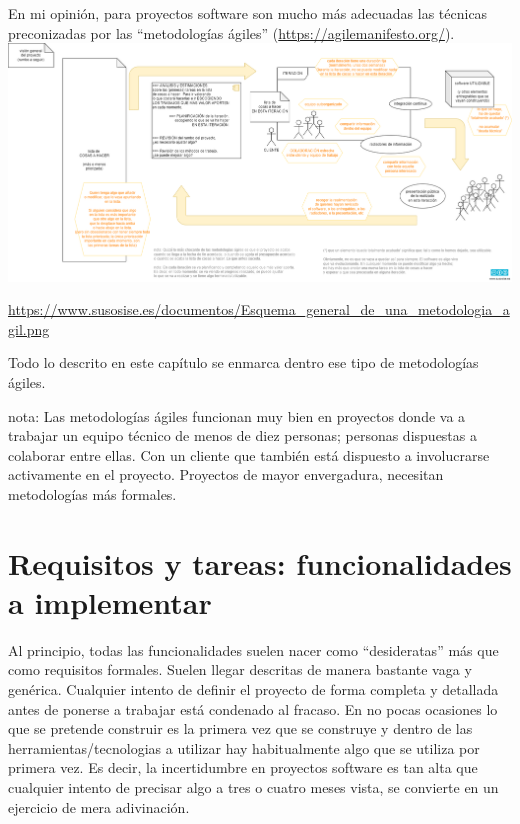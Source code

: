\documentclass[spanish,12pt,a4paper,final,oneside]{book}
\begin{document}
En mi opinión, para proyectos software son mucho más adecuadas las técnicas preconizadas por las ``metodologías ágiles'' (\url{https://agilemanifesto.org/}).
\\
\includegraphics[width=\textwidth]{Esquema_general_de_una_metodologia_agil} 
\begin{flushright}
\begin{scriptsize}
\url{https://www.susosise.es/documentos/Esquema_general_de_una_metodologia_agil.png}
\end{scriptsize}
\end{flushright}

Todo lo descrito en este capítulo se enmarca dentro ese tipo de metodologías ágiles.

nota: Las metodologías ágiles funcionan muy bien en proyectos donde va a trabajar un equipo técnico de menos de diez personas; personas dispuestas a colaborar entre ellas. Con un cliente que también está dispuesto a involucrarse activamente en el proyecto. Proyectos de mayor envergadura, necesitan metodologías más formales.

\section{Requisitos y tareas: funcionalidades a implementar}
Al principio, todas las funcionalidades suelen nacer como ``desideratas'' más que como requisitos formales. Suelen llegar descritas de manera bastante vaga y genérica. Cualquier intento de  definir el proyecto de forma completa y detallada antes de ponerse a trabajar está condenado al fracaso. En no pocas ocasiones lo que se pretende construir es la primera vez que se construye y dentro de las herramientas/tecnologias a utilizar hay habitualmente algo que se utiliza por primera vez. Es decir, la incertidumbre en proyectos software es tan alta que cualquier intento de precisar algo a tres o cuatro meses vista, se convierte en un ejercicio de mera adivinación.
\end{document}
